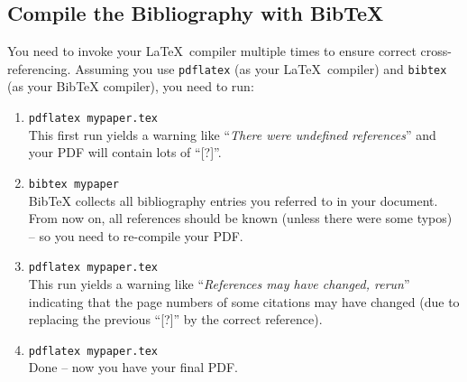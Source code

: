 \documentclass[11pt,a4paper]{article}
\begin{document}
%
\subsection{Compile the Bibliography with BibTeX}
\label{sec-bibtex-compile}

You need to invoke your \LaTeX~compiler multiple times to ensure correct 
cross-referencing.
Assuming you use \texttt{pdflatex} (as your \LaTeX~compiler) and \texttt{bibtex} (as your BibTeX compiler), you need to run:
\begin{enumerate}
 
\item \texttt{pdflatex mypaper.tex}\\[.5em]
This first run yields a warning like ``\emph{There were undefined references}'' and your PDF will contain lots of ``[?]''.

\item \texttt{bibtex mypaper}\\[.5em]
BibTeX collects all bibliography entries you referred to in your document. From now on, all references should be known (unless there were some typos) -- so you need to re-compile your PDF.

\item \texttt{pdflatex mypaper.tex}\\[.5em]
This run yields a warning like ``\emph{References may have changed, rerun}'' indicating that the page numbers of some citations may have changed (due to replacing the previous ``[?]'' by the correct reference).

\item \texttt{pdflatex mypaper.tex}\\[.5em]
Done -- now you have your final PDF.

\end{enumerate}



\newpage
\end{document}
